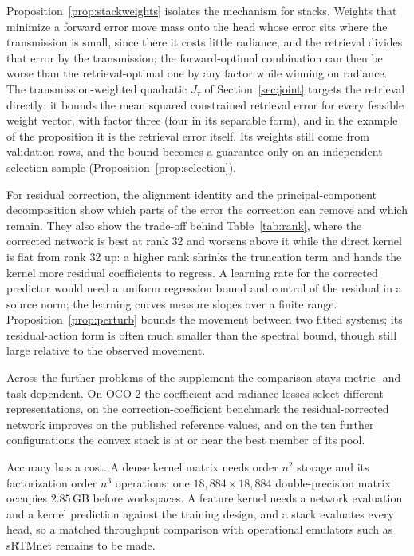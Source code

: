 \documentclass[11pt]{article}
\newcommand{\1}{\mathbf{1}}
\begin{document}
Proposition~\ref{prop:stackweights} isolates the mechanism for stacks. Weights that minimize a
forward error move mass onto the head whose error sits where the transmission is small, since
there it costs little radiance, and the retrieval divides that error by the transmission; the
forward-optimal combination can then be worse than the retrieval-optimal one by any factor while
winning on radiance. The transmission-weighted quadratic $J_\tau$ of Section~\ref{sec:joint}
targets the retrieval directly: it bounds the mean squared constrained retrieval error for every
feasible weight vector, with factor three (four in its separable form), and in the example of the
proposition it is the retrieval error itself. Its weights still come from validation rows, and
the bound becomes a guarantee only on an independent selection sample
(Proposition~\ref{prop:selection}).

For residual correction, the alignment identity and the principal-component decomposition show
which parts of the error the correction can remove and which remain. They also show the trade-off
behind Table~\ref{tab:rank}, where the corrected network is best at rank 32 and worsens above it
while the direct kernel is flat from rank 32 up: a higher rank shrinks the truncation term and
hands the kernel more residual coefficients to regress. A learning rate for
the corrected predictor would need a uniform regression bound and control of the residual in a
source norm; the learning curves measure slopes over a finite range. Proposition~\ref{prop:perturb}
bounds the movement between two fitted systems; its residual-action form is often much smaller
than the spectral bound, though still large relative to the observed movement.

Across the further problems of the supplement the comparison stays metric- and task-dependent.
On OCO-2 the coefficient and radiance losses select different representations, on the
correction-coefficient benchmark the residual-corrected network improves on the published
reference values, and on the ten further configurations the convex stack is at or near the best
member of its pool.

Accuracy has a cost. A dense kernel matrix needs order $n^2$ storage and its factorization order
$n^3$ operations; one $18{,}884\times18{,}884$ double-precision matrix occupies $2.85$\,GB before
workspaces. A feature kernel needs a network evaluation and a kernel prediction against the
training design, and a stack evaluates every head, so a matched throughput comparison with
operational emulators such as sRTMnet \cite{srtmnet} remains to be made.
\end{document}

